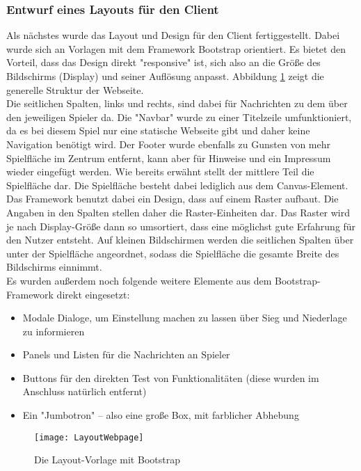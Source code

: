 \subsubsection{Entwurf eines Layouts für den Client}

Als nächstes wurde das Layout und Design für den Client fertiggestellt. Dabei wurde sich an Vorlagen mit dem Framework Bootstrap orientiert. Es bietet den Vorteil, dass das Design direkt "responsive" ist, sich also an die Größe des Bildschirms (Display) und seiner Auflösung anpasst. Abbildung \ref{fig:layoutWebpage} zeigt die generelle Struktur der Webseite.\\
Die seitlichen Spalten, links und rechts, sind dabei für Nachrichten zu dem \bzw über den jeweiligen Spieler da. Die "Navbar" wurde zu einer Titelzeile umfunktioniert, da es bei diesem Spiel nur eine statische Webseite gibt und daher keine Navigation benötigt wird. Der Footer wurde ebenfalls zu Gunsten von mehr Spielfläche im Zentrum entfernt, kann aber für Hinweise und ein Impressum wieder eingefügt werden. Wie bereits erwähnt stellt der mittlere Teil die Spielfläche dar. Die Spielfläche besteht dabei lediglich aus dem Canvas-Element.\\
Das Framework benutzt dabei ein Design, dass auf einem Raster aufbaut. Die Angaben in den Spalten stellen daher die Raster-Einheiten dar. Das Raster wird je nach Display-Größe dann so umsortiert, dass eine möglichst gute Erfahrung für den Nutzer entsteht. Auf kleinen Bildschirmen werden die seitlichen Spalten über \bzw unter der Spielfläche angeordnet, sodass die Spielfläche die gesamte Breite des Bildschirms einnimmt.\\
Es wurden außerdem noch folgende weitere Elemente aus dem Bootstrap-Framework direkt eingesetzt:

\begin{itemize}
	\item Modale Dialoge, um Einstellung machen zu lassen \bzw über Sieg und Niederlage zu informieren
	\item Panels und Listen für die Nachrichten an Spieler
	\item Buttons für den direkten Test von Funktionalitäten (diese wurden im Anschluss natürlich entfernt)
	\item Ein "Jumbotron" -- also eine große Box, mit farblicher Abhebung
\end{itemize}

\clearpage

\begin{figure}[htp]
	\centering
	\captionsetup{justification=centering}
	\texttt{[image: LayoutWebpage]}
	\caption[Layout Webseite]{Die Layout-Vorlage mit Bootstrap\footnotemark}
	\label{fig:layoutWebpage}
\end{figure}

